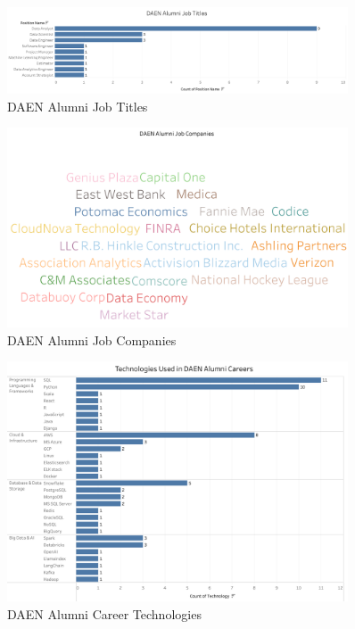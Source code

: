 \documentclass[12pt,a4paper]{article}
\begin{document}
\begin{figure}[H]
    \centering
    \includegraphics[width=0.9\textwidth]{visualizations/job-titles.png}
    \caption{DAEN Alumni Job Titles}
    \label{fig:job-titles}
\end{figure}

\begin{figure}[H]
    \centering
    \includegraphics[width=0.9\textwidth]{visualizations/job-companies.png}
    \caption{DAEN Alumni Job Companies}
    \label{fig:job-companies}
\end{figure}

\begin{figure}[H]
    \centering
    \includegraphics[width=0.9\textwidth]{visualizations/career-technologies.png}
    \caption{DAEN Alumni Career Technologies}
    \label{fig:career-technologies}
\end{figure}
\end{document}
